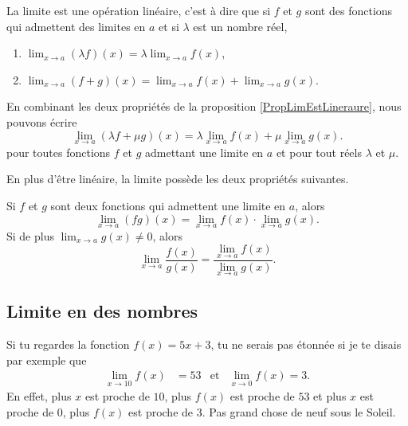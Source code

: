 \begin{proposition}	\label{PropLimEstLineraure}
	La limite est une opération linéaire, c'est à dire que si $f$ et $g$ sont des fonctions qui admettent des limites en $a$ et si $\lambda$ est un nombre réel,
	\begin{enumerate}

		\item
			$\lim_{x\to a} (\lambda f)(x)=\lambda\lim_{x\to a} f(x)$,
		\item
			$\lim_{x\to a} (f+g)(x)=\lim_{x\to a} f(x)+\lim_{x\to a} g(x)$.
	\end{enumerate}
\end{proposition}
En combinant les deux propriétés de la proposition \ref{PropLimEstLineraure}, nous pouvons écrire
\begin{equation}
	\lim_{x\to a} (\lambda f+\mu g)(x)=\lambda\lim_{x\to a} f(x)+\mu\lim_{x\to a} g(x).
\end{equation}
pour toutes fonctions $f$ et $g$ admettant une limite en $a$ et pour tout réels $\lambda$ et $\mu$.

En plus d'être linéaire, la limite possède les deux propriétés suivantes.
\begin{proposition}
	Si $f$ et $g$ sont deux fonctions qui admettent une limite en $a$, alors
	\begin{equation}
		\lim_{x\to a} (fg)(x)=\lim_{x\to a} f(x)\cdot\lim_{x\to a} g(x).
	\end{equation}
	Si de plus $\lim_{x\to a} g(x)\neq 0$, alors
	\begin{equation}
		\lim_{x\to a} \frac{ f(x) }{ g(x) }=\frac{ \lim_{x\to a} f(x) }{ \lim_{x\to a} g(x) }.
	\end{equation}
\end{proposition}

\subsection{Limite en des nombres}

Si tu regardes la fonction $f(x)=5x+3$, tu ne serais pas étonnée si je te disais par exemple que 
\begin{align}
\lim_{x\to 10}f(x)&=53&\text{et}&\lim_{x\to 0}f(x)=3.
\end{align}
En effet, plus $x$ est proche de $10$, plus $f(x)$ est proche de $53$ et plus $x$ est proche de $0$, plus $f(x)$ est proche de $3$. Pas grand chose de neuf sous le Soleil.


